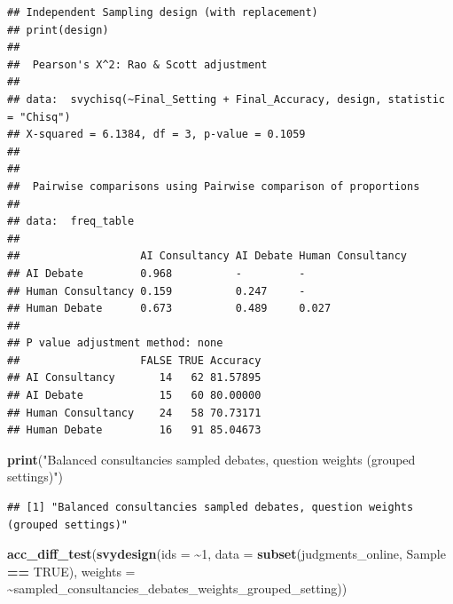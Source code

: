 \documentclass[
]{article}
\newenvironment{Shaded}{\begin{snugshade}}{\end{snugshade}}
\newcommand{\AttributeTok}[1]{\textcolor[rgb]{0.13,0.29,0.53}{#1}}
\newcommand{\ConstantTok}[1]{\textcolor[rgb]{0.56,0.35,0.01}{#1}}
\newcommand{\DecValTok}[1]{\textcolor[rgb]{0.00,0.00,0.81}{#1}}
\newcommand{\FunctionTok}[1]{\textcolor[rgb]{0.13,0.29,0.53}{\textbf{#1}}}
\newcommand{\NormalTok}[1]{#1}
\newcommand{\SpecialCharTok}[1]{\textcolor[rgb]{0.81,0.36,0.00}{\textbf{#1}}}
\newcommand{\StringTok}[1]{\textcolor[rgb]{0.31,0.60,0.02}{#1}}
\begin{document}
\begin{verbatim}
## Independent Sampling design (with replacement)
## print(design)
## 
##  Pearson's X^2: Rao & Scott adjustment
## 
## data:  svychisq(~Final_Setting + Final_Accuracy, design, statistic = "Chisq")
## X-squared = 6.1384, df = 3, p-value = 0.1059
## 
## 
##  Pairwise comparisons using Pairwise comparison of proportions 
## 
## data:  freq_table 
## 
##                   AI Consultancy AI Debate Human Consultancy
## AI Debate         0.968          -         -                
## Human Consultancy 0.159          0.247     -                
## Human Debate      0.673          0.489     0.027            
## 
## P value adjustment method: none 
##                   FALSE TRUE Accuracy
## AI Consultancy       14   62 81.57895
## AI Debate            15   60 80.00000
## Human Consultancy    24   58 70.73171
## Human Debate         16   91 85.04673
\end{verbatim}

\begin{Shaded}
\begin{Highlighting}[]
\FunctionTok{print}\NormalTok{(}\StringTok{"Balanced consultancies sampled debates, question weights (grouped settings)"}\NormalTok{)}
\end{Highlighting}
\end{Shaded}

\begin{verbatim}
## [1] "Balanced consultancies sampled debates, question weights (grouped settings)"
\end{verbatim}

\begin{Shaded}
\begin{Highlighting}[]
\FunctionTok{acc\_diff\_test}\NormalTok{(}\FunctionTok{svydesign}\NormalTok{(}\AttributeTok{ids =} \SpecialCharTok{\textasciitilde{}}\DecValTok{1}\NormalTok{, }\AttributeTok{data =} \FunctionTok{subset}\NormalTok{(judgments\_online, }\StringTok{\textasciigrave{}}\AttributeTok{Sample}\StringTok{\textasciigrave{}} \SpecialCharTok{==} \ConstantTok{TRUE}\NormalTok{), }\AttributeTok{weights =} \SpecialCharTok{\textasciitilde{}}\NormalTok{sampled\_consultancies\_debates\_weights\_grouped\_setting))}
\end{Highlighting}
\end{Shaded}
\end{document}
